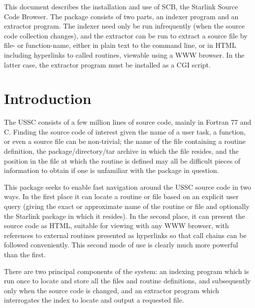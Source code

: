 \documentclass[twoside,11pt]{article}
\newcommand{\stardocinitials}  {SUN}
\newcommand{\stardocnumber}    {225.1(Draft)}
\newcommand{\stardocabstract}  {
This document describes the installation and use of SCB, 
the Starlink Source Code Browser.  
The package consists of two parts, an indexer program and an
extractor program.
The indexer need only be run infrequently (when the source code collection
changes), and the extractor can be run to extract a source file
by file- or function-name, either in plain text to the command line,
or in HTML including hyperlinks to called routines, viewable
using a WWW browser.  In the latter case, the extractor program 
must be installed as a CGI script.
}
\newcommand{\stardocname}{\stardocinitials /\stardocnumber}
\newenvironment{latexonly}{}{}
\newcommand{\xlabel}[1]{}
\renewcommand{\_}{\texttt{\symbol{95}}}
\renewcommand{\thepage}{\roman{page}}
\begin{document}
\stardocabstract
  \newpage
  \begin{latexonly}
    \setlength{\parskip}{0mm}
    \tableofcontents
    \setlength{\parskip}{\medskipamount}
    \markboth{\stardocname}{\stardocname}
  \end{latexonly}
\cleardoublepage
\renewcommand{\thepage}{\arabic{page}}
\setcounter{page}{1}


\section{\xlabel{sec:introduction}\label{sec:introduction}Introduction}

The USSC consists of a few million lines of source code, mainly in 
Fortran 77 and C. 
Finding the source code of interest given the name of a
user task, a function, or even a source file can be non-trivial;
the name of the file containing a routine definition,
the package/directory/tar archive in which the file resides,
and the position in the file at which the routine is defined
may all be difficult pieces of information to obtain if one is
unfamiliar with the package in question.

This package seeks to enable fast navigation around the USSC 
source code in two ways.  In the first place it can locate a routine
or file based on an explicit user query (giving the exact or
approximate name of the routine or file and optionally the Starlink 
package in which it resides).  In the second place, it can present
the source code as HTML, suitable for viewing with any WWW browser,
with references to external routines presented as hyperlinks so
that call chains can be followed conveniently.
This second mode of use is clearly much more powerful than the first.

There are two principal components of the system: an indexing program
which is run once to locate and store all the files and routine 
definitions, and subsequently only when the source code is changed,
and an extractor program which interrogates the index to locate 
and output a requested file.
\end{document}
